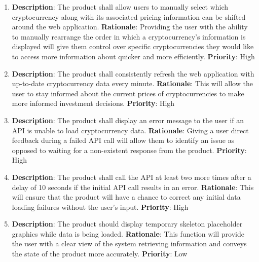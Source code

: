 \documentclass[12pt, titlepage]{article}
\begin{document}
\begin{enumerate}[label = FR-\arabic*, left=\parindent, series=fr]
    \item \textbf{Description}: The product shall allow users to manually select which cryptocurrency along with its associated pricing information can be shifted around the web application.
    \newline \textbf{Rationale}: Providing the user with the ability to manually rearrange the order in which a cryptocurrency's information is displayed will give them control over specific cryptocurrencies they would like to access more information about quicker and more efficiently.
    \newline \textbf{Priority}: High

    \item \textbf{Description}: The product shall consistently refresh the web application with up-to-date cryptocurrency data every minute.
    \newline \textbf{Rationale}: This will allow the user to stay informed about the current prices of cryptocurrencies to make more informed investment decisions.
    \newline \textbf{Priority}: High
    
    \item \textbf{Description}: The product shall display an error message to the user if an API is unable to load cryptocurrency data.
    \newline \textbf{Rationale}: Giving a user direct feedback during a failed API call will allow them to identify an issue as opposed to waiting for a non-existent response from the product. 
    \newline \textbf{Priority}: High
    
    \item \textbf{Description}: The product shall call the API at least two more times after a delay of 10 seconds if the initial API call results in an error.
    \newline \textbf{Rationale}: This will ensure that the product will have a chance to correct any initial data loading failures without the user's input.
    \newline \textbf{Priority}: High
    
    \item \textbf{Description}: The product should display temporary skeleton placeholder graphics while data is being loaded. 
    \newline \textbf{Rationale}: This function will provide the user with a clear view of the system retrieving information and conveys the state of the product more accurately. 
    \newline \textbf{Priority}: Low
    

\end{enumerate}
\end{document}
